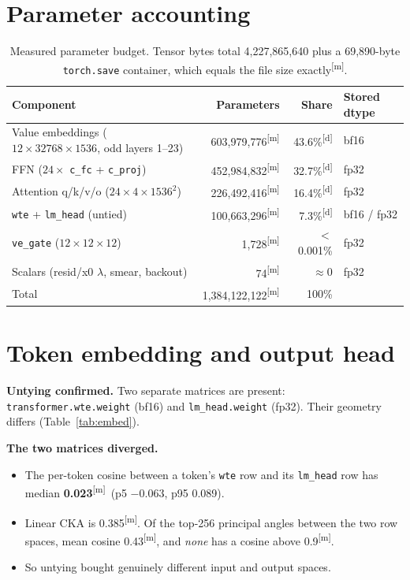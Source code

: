 \documentclass[11pt]{article}
\newcommand{\meas}{\textsuperscript{[m]}}   %
\newcommand{\der}{\textsuperscript{[d]}}    %
\begin{document}
\section{Parameter accounting}
\begin{table}[h]\centering\small
\begin{tabular}{@{}lrrl@{}}
\toprule
Component & Parameters & Share & Stored dtype \\
\midrule
Value embeddings ($12\times 32768\times 1536$, odd layers 1--23) & 603{,}979{,}776\meas & 43.6\%\der & bf16 \\
FFN ($24\times$ \texttt{c\_fc} + \texttt{c\_proj}) & 452{,}984{,}832\meas & 32.7\%\der & fp32 \\
Attention q/k/v/o ($24\times 4\times 1536^2$) & 226{,}492{,}416\meas & 16.4\%\der & fp32 \\
\texttt{wte} + \texttt{lm\_head} (untied) & 100{,}663{,}296\meas & 7.3\%\der & bf16 / fp32 \\
\texttt{ve\_gate} ($12\times 12\times 12$) & 1{,}728\meas & $<$0.001\% & fp32 \\
Scalars (resid/x0 $\lambda$, smear, backout) & 74\meas & $\approx 0$ & fp32 \\
\midrule
Total & 1{,}384{,}122{,}122\meas & 100\% & \\
\bottomrule
\end{tabular}
\caption{Measured parameter budget. Tensor bytes total 4{,}227{,}865{,}640 plus a 69{,}890-byte \texttt{torch.save} container, which equals the file size exactly\meas.}
\label{tab:budget}
\end{table}

\section{Token embedding and output head}
\label{sec:embed}
\textbf{Untying confirmed.} Two separate matrices are present: \texttt{transformer.wte.weight} (bf16) and \texttt{lm\_head.weight} (fp32). Their geometry differs (Table~\ref{tab:embed}).

\textbf{The two matrices diverged.}
\begin{itemize}
\item The per-token cosine between a token's \texttt{wte} row and its \texttt{lm\_head} row has median \textbf{0.023}\meas\ (p5 $-0.063$, p95 0.089).
\item Linear CKA is 0.385\meas. Of the top-256 principal angles between the two row spaces, mean cosine 0.43\meas, and \emph{none} has a cosine above 0.9\meas.
\item So untying bought genuinely different input and output spaces.
\end{itemize}
\end{document}
